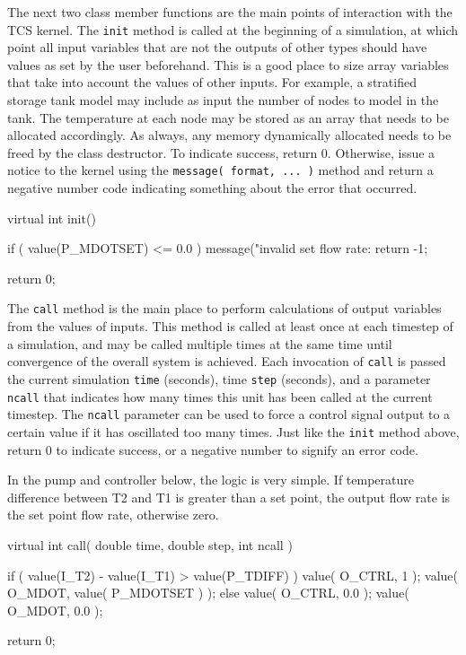\documentclass{article}
\begin{document}
The next two class member functions are the main points of interaction with the TCS kernel.  The \texttt{init} method is called at the beginning of a simulation, at which point all input variables that are not the outputs of other types should have values as set by the user beforehand.  This is a good place to size array variables that take into account the values of other inputs.  For example, a stratified storage tank model may include as input the number of nodes to model in the tank.  The temperature at each node may be stored as an array that needs to be allocated accordingly.  As always, any memory dynamically allocated needs to be freed by the class destructor.  To indicate success, return 0.  Otherwise, issue a notice to the kernel using the \texttt{message( format, ... )} method and return a negative number code indicating something about the error that occurred.

\begin{verbatimtab}[4]

	virtual int init()
	{
		if ( value(P_MDOTSET) <= 0.0 )
		{
			message("invalid set flow rate: %
			return -1;
		}
		
		return 0;
	}
	
\end{verbatimtab}

The \texttt{call} method is the main place to perform calculations of output variables from the values of inputs.  This method is called at least once at each timestep of a simulation, and may be called multiple times at the same time until convergence of the overall system is achieved.  Each invocation of \texttt{call} is passed the current simulation \texttt{time} (seconds), time \texttt{step} (seconds), and a parameter \texttt{ncall} that indicates how many times this unit has been called at the current timestep.  The \texttt{ncall} parameter can be used to force a control signal output to a certain value if it has oscillated too many times.  Just like the \texttt{init} method above, return 0 to indicate success, or a negative number to signify an error code.

In the pump and controller below, the logic is very simple.  If temperature difference between T2 and T1 is greater than a set point, the output flow rate is the set point flow rate, otherwise zero.

\begin{verbatimtab}[4]

	virtual int call( double time, double step, int ncall )
	{
		if ( value(I_T2) - value(I_T1) > value(P_TDIFF) )
		{
			value( O_CTRL, 1 );
			value( O_MDOT, value( P_MDOTSET ) );
		}
		else
		{
			value( O_CTRL, 0.0 );
			value( O_MDOT, 0.0 );
		}
		
		return 0;
	}

\end{verbatimtab}
\end{document}
